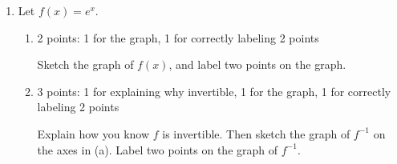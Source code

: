 \documentclass{article}
\begin{document}
\begin{enumerate}
\begin{enumerate}
    \begin{solution}
      The domain of $f$ is $(2, \infty)$ and the range of $f$ is $(-\infty, 5)$. 
      So the domain of $g$ is $(-\infty, 5)$ and the range of $g$ is $(2, \infty)$.
    \end{solution}

  \end{enumerate}

\item 

  Let $f(x) = e^x$.  

  \begin{enumerate}

  \item

    \begin{grading}
      2 points: 1 for the graph, 1 for correctly labeling 2 points
    \end{grading}

    \begin{problem}[\vfill]
      Sketch the graph of $f(x)$, and label two points on the graph. 
    \end{problem}

    \begin{solution}
      \begin{center}
      \end{center}
    \end{solution}

  \item

    \begin{grading}
      3 points: 1 for explaining why invertible, 1 for the graph, 1 for correctly labeling 2 points
    \end{grading}

    \begin{problem}[\vfill]
      Explain how you know $f$ is invertible. Then sketch the graph of $f^{-1}$ on the axes in (a). Label two points on the graph of $f^{-1}$.
    \end{problem}


\end{enumerate}
\end{enumerate}
\end{document}
